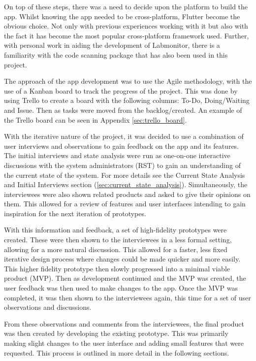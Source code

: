 \documentclass [11pt,a4paper]{article}
\begin{document}
On top of these steps, there was a need to decide upon the platform to build the app. Whilst knowing the app needed to be cross-platform, Flutter become the obvious choice. Not only with previous experiences working with it but also with the fact it has become the most popular cross-platform framework \cite{JetBrainsFlutter} used. Further, with personal work in aiding the development of Labmonitor\cite{labmonitor}, there is a familiarity with the code scanning package that has also been used in this project\cite{barcodeScannerPlugin}.

The approach of the app development was to use the Agile methodology, with the use of a Kanban board to track the progress of the project. This was done by using Trello to create a board with the following columns: To-Do, Doing/Waiting and Issue. Then as tasks were moved from the backlog/created. An example of the Trello board can be seen in Appendix \ref{sec:trello_board}.

\pagebreak

With the iterative nature of the project, it was decided to use a combination of user interviews and observations to gain feedback on the app and its features. The initial interviews and state analysis were run as one-on-one interactive discussions with the system administrators (RST) to gain an understanding of the current state of the system. For more details see the Current State Analysis and Initial Interviews section (\ref{sec:current_state_analysis}). Simultaneously, the interviewees were also shown related products and asked to give their opinions on them. This allowed for a review of features and user interfaces intending to gain inspiration for the next iteration of prototypes. 

With this information and feedback, a set of high-fidelity prototypes were created. These were then shown to the interviewees in a less formal setting, allowing for a more natural discussion. This allowed for a faster, less fixed iterative design process where changes could be made quicker and more easily. This higher fidelity prototype then slowly progressed into a minimal viable product (MVP). Then as development continued and the MVP was created, the user feedback was then used to make changes to the app. Once the MVP was completed, it was then shown to the interviewees again, this time for a set of user observations and discussions. 

From these observations and comments from the interviewees, the final product was then created by developing the existing prototype. This was primarily making slight changes to the user interface and adding small features that were requested. This process is outlined in more detail in the following sections.
\end{document}
